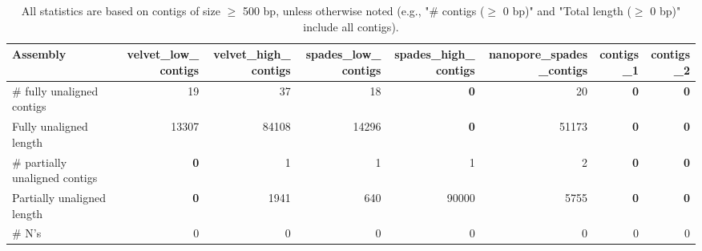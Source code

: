 \documentclass[12pt,a4paper]{article}
\begin{document}
\begin{table}[ht]
\begin{center}
\caption{All statistics are based on contigs of size $\geq$ 500 bp, unless otherwise noted (e.g., "\# contigs ($\geq$ 0 bp)" and "Total length ($\geq$ 0 bp)" include all contigs).}
\begin{tabular}{|l*{7}{|r}|}
\hline
Assembly & velvet\_low\_contigs & velvet\_high\_contigs & spades\_low\_contigs & spades\_high\_contigs & nanopore\_spades\_contigs & contigs\_1 & contigs\_2 \\ \hline
\# fully unaligned contigs & 19 & 37 & 18 & {\bf 0} & 20 & {\bf 0} & {\bf 0} \\ \hline
Fully unaligned length & 13307 & 84108 & 14296 & {\bf 0} & 51173 & {\bf 0} & {\bf 0} \\ \hline
\# partially unaligned contigs & {\bf 0} & 1 & 1 & 1 & 2 & {\bf 0} & {\bf 0} \\ \hline
Partially unaligned length & {\bf 0} & 1941 & 640 & 90000 & 5755 & {\bf 0} & {\bf 0} \\ \hline
\# N's & 0 & 0 & 0 & 0 & 0 & 0 & 0 \\ \hline
\end{tabular}
\end{center}
\end{table}
\end{document}
